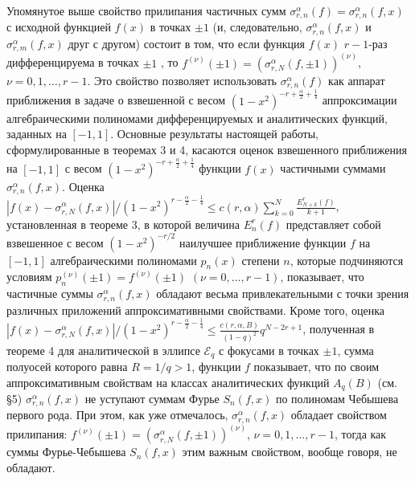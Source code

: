 Упомянутое выше свойство прилипания частичных сумм $\sigma_{r,n}^\alpha(f)=\sigma_{r,n}^\alpha(f,x)$  с исходной функцией $f(x)$ в точках $\pm1$  (и, следовательно, $\sigma_{r,n}^\alpha(f,x)$ и $\sigma_{r,m}^\alpha(f,x)$ друг с другом) состоит в том, что если функция $f(x)$ $r-1$-раз дифференцируема в точках $\pm1$ , то  $f^{(\nu)}(\pm1)=(\sigma_{r,N}^\alpha(f,\pm1))^{(\nu)}$, $\nu=0,1,\ldots, r-1$. Это свойство позволяет использовать $\sigma_{r,n}^\alpha(f)$ как аппарат приближения в задаче о взвешенной с весом $(1-x^2)^{-r+\frac\alpha2+\frac14}$ аппроксимации алгебраическими полиномами дифференцируемых и аналитических функций, заданных на $[-1,1]$. Основные результаты настоящей работы, сформулированные в теоремах 3 и 4, касаются оценок  взвешенного приближения на $[-1,1]$ с весом $(1-x^2)^{-r+\frac\alpha2+\frac14}$  функции $f(x)$ частичными суммами $\sigma_{r,n}^\alpha(f,x)$. Оценка
$ |f(x)-\sigma_{r,N}^\alpha(f,x)|/(1-x^2)^{r-\frac{\alpha}{2}-\frac14}\le c(r,\alpha)\sum_{k=0}^N\frac{E_{N+k}^r(f)}{k+1}$, установленная в теореме 3, в которой величина $E_{n}^r(f)$ представляет собой взвешенное с весом $(1-x^2)^{-r/2}$ наилучшее приближение функции $f$ на $[-1,1]$ алгебраическими полиномами $p_n(x)$ степени $n$, которые подчиняются условиям $p_n^{(\nu)}(\pm1)=f^{(\nu)}(\pm1)$ $(\nu=0,\ldots, r-1)$, показывает, что  частичные суммы $\sigma_{r,n}^\alpha(f,x)$ обладают весьма привлекательными с точки зрения различных приложений аппроксимативными свойствами. Кроме того, оценка $|f(x)-\sigma_{r,N}^\alpha(f,x)|/(1-x^2)^{r-\frac{\alpha}{2}-\frac14}\le\frac{c(r,\alpha, B)}{(1-q)^2}q^{N-2r+1}$, полученная в теореме 4 для аналитической в эллипсе $\mathcal{ E}_q$  с фокусами в точках $\pm1$, сумма полуосей которого равна $R=1/q>1$, функции $f$ показывает, что   по своим аппроксимативным свойствам на классах аналитических функций $A_q(B)$ (см. \S5) $\sigma_{r,n}^\alpha(f,x)$ не уступают суммам Фурье $S_n(f,x)$ по полиномам Чебышева первого рода. При этом, как уже отмечалось, $\sigma_{r,n}^\alpha(f,x)$ обладает свойством прилипания:  $f^{(\nu)}(\pm1)=(\sigma_{r,N}^\alpha(f,\pm1))^{(\nu)}$, $\nu=0,1,\ldots, r-1$, тогда как суммы Фурье-Чебышева $S_n(f,x)$ этим важным свойством, вообще говоря, не обладают.

